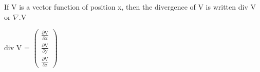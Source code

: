 If V is a vector function of position x, then the divergence of V is written
div V or $\nabla . \mathrm{V}$
\par
div V = $ 
\left( 
\begin{array}{c} 
  \frac{\partial \mathrm{V}}{\partial \mathrm{x}} \\
  \frac{\partial \mathrm{V}}{\partial \mathrm{y}} \\
  \frac{\partial \mathrm{V}}{\partial \mathrm{z}}
\end{array} 
\right ) $